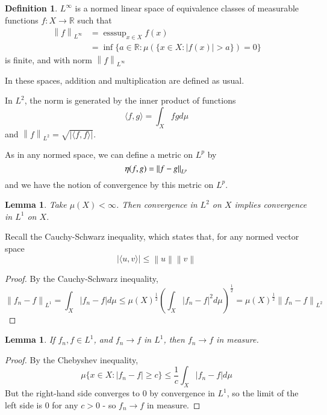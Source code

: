 \documentclass[11pt,a4paper]{report}
\newtheorem{lemma}[theorem]{Lemma}
\theoremstyle{plain}
\theoremstyle{definition}
\newtheorem*{defn}{Definition}
\theoremstyle{remark}
\newcommand{\R}{\mathbb{R}}
\newcommand{\abs}[1]{\left| #1 \right|}
\newcommand{\norm}[1]{\left\lVert #1 \right\rVert}
\begin{document}
\newcommand{\ess}{\text{ess}}
\newcommand{\esssup}{{\ess\sup}}

\begin{defn}
  $L^\infty$ is a normed linear space of equivalence classes of measurable functions $f : X \to \R$ such that
  \begin{align*}
    \norm{f}_{L^\infty} &= \esssup_{x \in X} f(x) \\
      &= \inf \{ a \in \R : \mu(\{ x \in X : \abs{f(x)} > a \}) = 0 \}
  \end{align*}
  is finite, and with norm $\norm{f}_{L^\infty}$
\end{defn}

In these spaces, addition and multiplication are defined as usual.

In $L^2$, the norm is generated by the inner product of functions
$$ \langle f, g \rangle = \int_X fg d\mu $$
and $\norm{f}_{L^2} = \sqrt{\abs{\langle f, f \rangle}}$.

As in any normed space, we can define a metric on $L^p$ by
$$ \eta(f, g) = \normlp{f - g} $$
and we have the notion of convergence by this metric on $L^p$.

\begin{lemma}
  Take $\mu(X) < \infty$. Then convergence in $L^2$ on $X$ implies convergence in $L^1$ on $X$.
\end{lemma}

Recall the Cauchy-Schwarz inequality, which states that, for any normed vector space
$$ \abs{\langle u, v\rangle} \le \norm{u}\norm{v} $$

\begin{proof}
  By the Cauchy-Schwarz inequality,
  $$ \norm{f_n - f}_{L^1} = \int_X \abs{f_n - f}d\mu \le \mu(X)^\frac{1}{2} \left( \int_X \abs{f_n - f}^2 d\mu \right)^\frac{1}{2} = \mu(X)^\frac{1}{2}\norm{f_n -f}_{L^2} $$
\end{proof}

\begin{lemma}
  If $f_n, f \in L^1$, and $f_n \to f$ in $L^1$, then $f_n \to f$ in measure.
\end{lemma}

\begin{proof}
  By the Chebyshev inequality,
  $$ \mu\{ x \in X : \abs{f_n - f} \ge c\} \le \frac{1}{c}\int_X \abs{f_n - f} d\mu $$
  But the right-hand side converges to $0$ by convergence in $L^1$, so the limit of the left side is $0$ for any $c > 0$ - so $f_n \to f$ in measure.
\end{proof}
\end{document}
